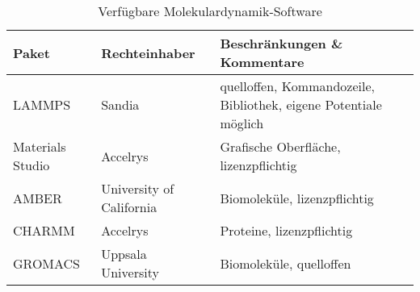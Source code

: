 \begin{table}
  \oddrowcolors
  \caption[Verfügbare Molekulardynamik-Software]{
    Verfügbare Molekulardynamik-Software
  }
  \label{tab:mdsoftware}
  \begin{tabularx}{\textwidth}{|llX|}
    \hline
    \textbf{Paket}                                                               & \textbf{Rechteinhaber}   & \textbf{Beschränkungen \& Kommentare}                            \\
    \hline
    LAMMPS\cite{plimpton_lammps_2014,plimpton_fast_1995}                         & Sandia                   & quelloffen, Kommandozeile, Bibliothek, eigene Potentiale möglich \\
    Materials Studio\cite{biovia_materials_2014}                                 & Accelrys                 & Grafische Oberfläche, lizenzpflichtig                            \\
    AMBER\cite{case_amber_2014,case_amber_2005}                                  & University of California & Biomoleküle, lizenzpflichtig                                     \\
    CHARMM\cite{brooks_charmm_2014,brooks_charmm:_1983,brooks_charmm:_2009}      & Accelrys                 & Proteine, lizenzpflichtig                                        \\
    GROMACS\cite{lindahl_gromacs_2014,berendsen_gromacs:_1995,hess_gromacs_2008} & Uppsala University       & Biomoleküle, quelloffen                                          \\
    \hline
  \end{tabularx}
\end{table}
